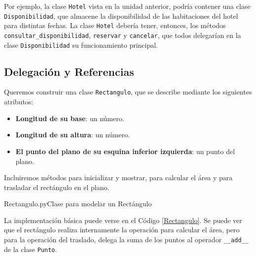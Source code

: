 Por ejemplo, la clase \lstinline!Hotel! vista en la unidad anterior, podría
contener una clase \lstinline!Disponibilidad!, que almacene la
disponibilidad de las habitaciones del hotel para distintas fechas.  La
clase \lstinline!Hotel! debería tener, entonces, los métodos
\lstinline!consultar_disponibilidad!, \lstinline!reservar! y
\lstinline!cancelar!, que todos delegarían en la clase
\lstinline!Disponibilidad! su funcionamiento principal. 




\subsection*{Delegación y Referencias}

Queremos construir una clase \lstinline!Rectangulo!, que se describe
mediante los siguientes atributos:

\begin{itemize}
\item {\bf Longitud de su base}: un número.

\item {\bf Longitud de su altura}: un número.

\item {\bf El punto del plano de su esquina inferior izquierda}: un punto del plano.

\end{itemize}

Incluiremos métodos para inicializar y mostrar, para calcular el área y
para trasladar el rectángulo en el plano.

\begin{codigo}{Rectangulo.py}{Clase para modelar un Rectángulo}
\label{Rectangulo}

\end{codigo}

La implementación básica puede verse en el Código \ref{Rectangulo}.  Se
puede ver que el rectángulo realiza internamente la operación para calcular
el área, pero para la operación del traslado, delega la suma de los puntos
al operador \lstinline!__add__! de la clase \lstinline!Punto!.

